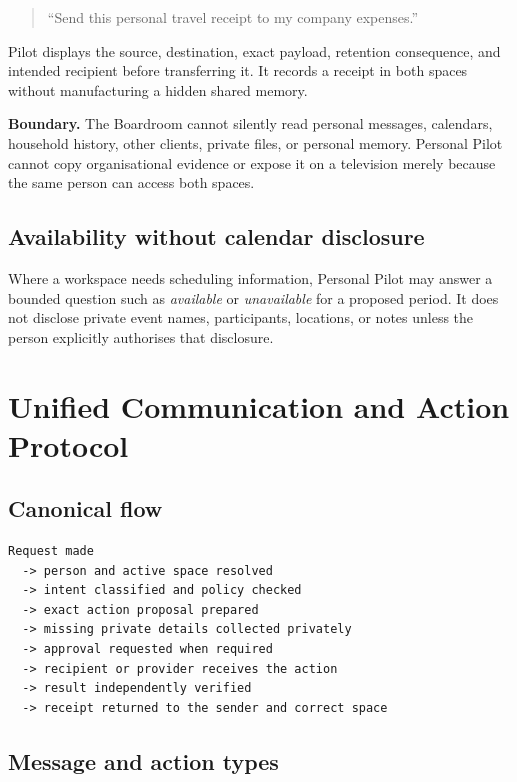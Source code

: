 \documentclass[11pt,a4paper]{article}
\newcommand{\boundary}[1]{%
  \par\medskip\noindent
  \colorbox{pilotamber!10}{\parbox{0.94\linewidth}{\textbf{Boundary.} #1}}%
  \par\medskip}
\begin{document}
\begin{quote}
``Send this personal travel receipt to my company expenses.''
\end{quote}

Pilot displays the source, destination, exact payload, retention consequence,
and intended recipient before transferring it.  It records a receipt in both
spaces without manufacturing a hidden shared memory.

\boundary{The Boardroom cannot silently read personal messages, calendars,
household history, other clients, private files, or personal memory.  Personal
Pilot cannot copy organisational evidence or expose it on a television merely
because the same person can access both spaces.}

\subsection{Availability without calendar disclosure}

Where a workspace needs scheduling information, Personal Pilot may answer a
bounded question such as \emph{available} or \emph{unavailable} for a proposed
period.  It does not disclose private event names, participants, locations, or
notes unless the person explicitly authorises that disclosure.

\section{Unified Communication and Action Protocol}

\subsection{Canonical flow}

\begin{lstlisting}[style=pilotcode]
Request made
  -> person and active space resolved
  -> intent classified and policy checked
  -> exact action proposal prepared
  -> missing private details collected privately
  -> approval requested when required
  -> recipient or provider receives the action
  -> result independently verified
  -> receipt returned to the sender and correct space
\end{lstlisting}

\subsection{Message and action types}
\end{document}
